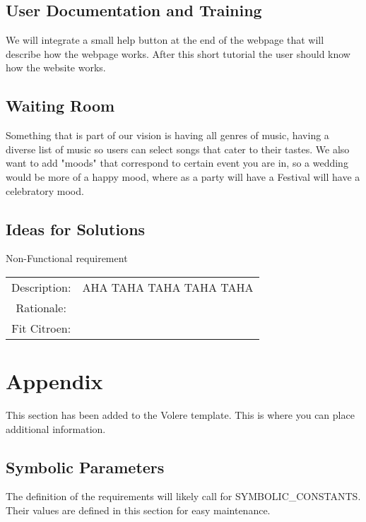 \documentclass[12pt, titlepage]{article}
\begin{document}
\subsection{User Documentation and Training}

We will integrate a small help button at the end of the webpage that will describe how the webpage works. After this short tutorial the user should know how the website works.

\subsection{Waiting Room}

Something that is part of our vision is having all genres of music, having a diverse list of music so users can select songs that cater to their tastes. We also want to add "moods" that correspond to certain event you are in, so a wedding would be more of a happy mood, where as a party will have a Festival will have a celebratory mood.

\subsection{Ideas for Solutions}

\begin{center}
Non-Functional requirement \\
\begin{tabular}{| c | c | }
\hline
Description:& AHA TAHA TAHA TAHA TAHA   \\ 
 Rationale: & \\
Fit Citroen: & \\
\hline
\end{tabular}
\end{center}

\newpage





\newpage

\section{Appendix}

This section has been added to the Volere template.  This is where you can place
additional information.

\subsection{Symbolic Parameters}

The definition of the requirements will likely call for SYMBOLIC\_CONSTANTS.
Their values are defined in this section for easy maintenance.
\end{document}
